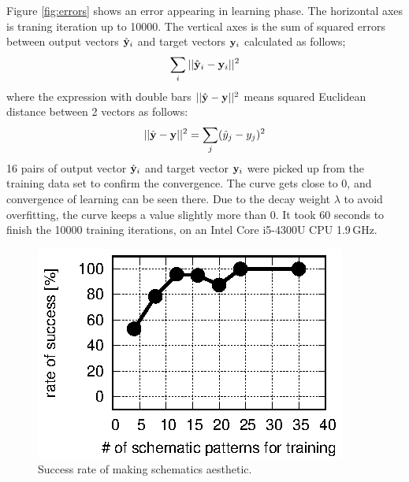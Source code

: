 \documentclass[twocolumn]{article}
\begin{document}
Figure \ref{fig:errors} shows an error appearing in learning phase.
The horizontal axes is traning iteration up to 10000.
The vertical axes is the sum of squared errors between
output vectors $\hat{\bf y}_i$ and target vectors ${\bf y}_i$
calculated as follows;
\begin{eqnarray}
\sum_i||\hat{\bf y}_i - {\bf y}_i||^2
\end{eqnarray}
where the expression with double bars $||\hat{\bf y} - {\bf y}||^2$ 
means squared Euclidean distance between 2 vectors as follows:
\begin{eqnarray}
||\hat{\bf y} - {\bf y}||^2 =
\sum_j(\hat{y}_j - y_j)^2
\end{eqnarray}
16 pairs of output vector $\hat{\bf y}_i$ and target vector ${\bf y}_i$
were picked up from the training data set to confirm the convergence.
The curve gets close to 0, and convergence of learning can be seen there.
Due to the decay weight $\lambda$ to avoid overfitting,
the curve keeps a value slightly more than 0.
It took 60 seconds to finish the 10000 training iterations,
on an Intel Core i5-4300U CPU 1.9\,GHz.

\begin{figure}[!tp]
 \begin{center}
  \begin{minipage}{\hsize}
   \includegraphics[width=\hsize]{fig/test_data.eps}
   \caption{Success rate of making schematics aesthetic.}
   \label{fig:test_data}
  \end{minipage}
 \end{center}
\end{figure}
\end{document}
